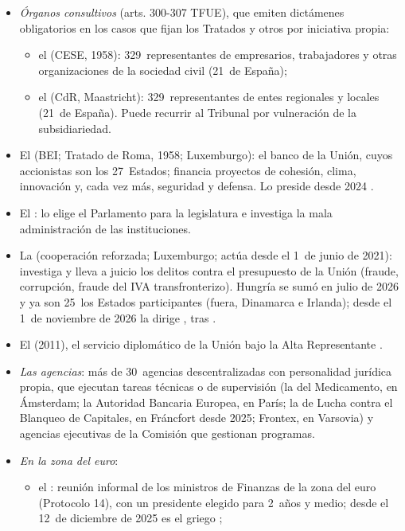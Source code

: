 \documentclass[11pt]{article}
\begin{document}
\begin{itemize}
\item \emph{Órganos consultivos} (arts. 300-307 TFUE), que emiten dictámenes obligatorios en los casos que fijan los Tratados y otros por iniciativa propia:
  \begin{itemize}
  \item el  (CESE, 1958): 329~representantes de empresarios, trabajadores y otras organizaciones de la sociedad civil (21~de España);
  \item el  (CdR, Maastricht): 329~representantes de entes regionales y locales (21~de España). Puede recurrir al Tribunal por vulneración de la subsidiariedad.
  \end{itemize}
\item El  (BEI; Tratado de Roma, 1958; Luxemburgo): el banco de la Unión, cuyos accionistas son los 27~Estados; financia proyectos de cohesión, clima, innovación y, cada vez más, seguridad y defensa. Lo preside  desde 2024 .
\item El : lo elige el Parlamento para la legislatura e investiga la mala administración de las instituciones.
\item La  (cooperación reforzada; Luxemburgo; actúa desde el 1~de junio de 2021): investiga y lleva a juicio los delitos contra el presupuesto de la Unión (fraude, corrupción, fraude del IVA transfronterizo). Hungría se sumó en julio de 2026 y ya son 25~los Estados participantes (fuera, Dinamarca e Irlanda)\nocite{Eucrim2026Hungria}; desde el 1~de noviembre de 2026 la dirige , tras \nocite{EPPO2026Ritter}.
\item El  (2011), el servicio diplomático de la Unión bajo la Alta Representante .
\item \emph{Las agencias}: más de 30~agencias descentralizadas con personalidad jurídica propia, que ejecutan tareas técnicas o de supervisión (la del Medicamento, en Ámsterdam; la Autoridad Bancaria Europea, en París; la de Lucha contra el Blanqueo de Capitales, en Fráncfort desde 2025; Frontex, en Varsovia) y agencias ejecutivas de la Comisión que gestionan programas.
\item \emph{En la zona del euro}:
  \begin{itemize}
  \item el : reunión informal de los ministros de Finanzas de la zona del euro (Protocolo 14), con un presidente elegido para 2~años y medio; desde el 12~de diciembre de 2025 es el griego \nocite{Eurogrupo2025Presidente};

\end{itemize}
\end{itemize}
\end{document}
